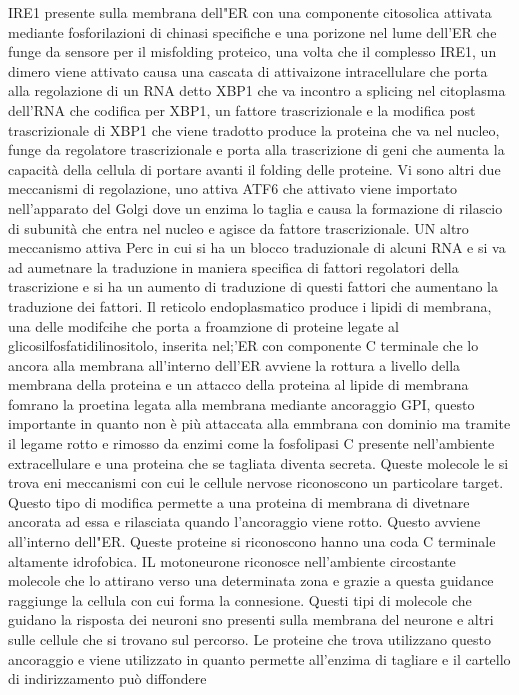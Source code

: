 IRE1 presente sulla membrana dell"ER con una componente citosolica attivata mediante fosforilazioni di chinasi specifiche e una porizone nel lume dell'ER che funge da sensore per il 
misfolding proteico, una volta che il complesso IRE1, un dimero viene attivato causa una cascata di attivaizone intracellulare che porta alla regolazione di un RNA detto XBP1 che va
incontro a splicing nel citoplasma dell'RNA che codifica per XBP1, un fattore trascrizionale e la modifica post trascrizionale di XBP1 che viene tradotto produce la proteina che 
va nel nucleo, funge da regolatore trascrizionale e porta alla trascrizione di geni che aumenta la capacit\`a della cellula di portare avanti il folding delle proteine. Vi sono 
altri due meccanismi di regolazione, uno attiva ATF6 che attivato viene importato nell'apparato del Golgi dove un enzima lo taglia e causa la formazione di rilascio di subunit\`a che
entra nel nucleo e agisce da fattore trascrizionale. UN altro meccanismo attiva Perc in cui si ha un blocco traduzionale di alcuni RNA e si va ad aumetnare la traduzione in maniera 
specifica di fattori regolatori della trascrizione e si ha un aumento di traduzione di questi fattori che aumentano la traduzione dei fattori. Il reticolo endoplasmatico produce i 
lipidi di membrana, una delle modifcihe che porta a froamzione di proteine legate al glicosilfosfatidilinositolo, inserita nel;'ER con componente C terminale che lo ancora alla membrana
all'interno dell'ER avviene la rottura a livello della membrana della proteina e un attacco della proteina al lipide di membrana fomrano la proetina legata alla membrana mediante
ancoraggio GPI, questo importante in quanto non \`e pi\`u attaccata alla emmbrana con dominio ma tramite il legame rotto e rimosso da enzimi come la fosfolipasi C presente nell'ambiente
extracellulare e una proteina che se tagliata diventa secreta. Queste molecole le si trova eni meccanismi con cui le cellule nervose riconoscono un particolare target. Questo tipo di 
modifica permette a una proteina di membrana di divetnare ancorata ad essa e rilasciata quando l'ancoraggio viene rotto. Questo avviene all'interno dell"ER. Queste proteine si 
riconoscono hanno una coda C terminale altamente idrofobica. IL motoneurone riconosce nell'ambiente circostante molecole che lo attirano verso una determinata zona e grazie a questa
guidance raggiunge la cellula con cui forma la connesione. Questi tipi di molecole che guidano la risposta dei neuroni sno presenti sulla membrana del neurone e altri sulle cellule che
si trovano sul percorso. Le proteine che trova utilizzano questo ancoraggio e viene utilizzato in quanto permette all'enzima di tagliare e il cartello di indirizzamento pu\`o diffondere
